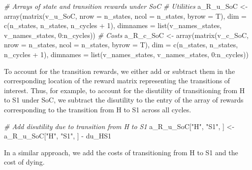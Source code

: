 \documentclass[
]{article}
\newenvironment{Shaded}{\begin{snugshade}}{\end{snugshade}}
\newcommand{\AttributeTok}[1]{\textcolor[rgb]{0.77,0.63,0.00}{#1}}
\newcommand{\CommentTok}[1]{\textcolor[rgb]{0.56,0.35,0.01}{\textit{#1}}}
\newcommand{\DecValTok}[1]{\textcolor[rgb]{0.00,0.00,0.81}{#1}}
\newcommand{\FunctionTok}[1]{\textcolor[rgb]{0.00,0.00,0.00}{#1}}
\newcommand{\NormalTok}[1]{#1}
\newcommand{\OtherTok}[1]{\textcolor[rgb]{0.56,0.35,0.01}{#1}}
\newcommand{\SpecialCharTok}[1]{\textcolor[rgb]{0.00,0.00,0.00}{#1}}
\newcommand{\StringTok}[1]{\textcolor[rgb]{0.31,0.60,0.02}{#1}}
\begin{document}
\begin{Shaded}
\begin{Highlighting}[]
\CommentTok{\# Arrays of state and transition rewards under SoC}
\CommentTok{\# Utilities}
\NormalTok{a\_R\_u\_SoC }\OtherTok{\textless{}{-}} \FunctionTok{array}\NormalTok{(}\FunctionTok{matrix}\NormalTok{(v\_u\_SoC, }\AttributeTok{nrow =}\NormalTok{ n\_states, }\AttributeTok{ncol =}\NormalTok{ n\_states, }\AttributeTok{byrow =}\NormalTok{ T), }
                  \AttributeTok{dim =} \FunctionTok{c}\NormalTok{(n\_states, n\_states, n\_cycles }\SpecialCharTok{+} \DecValTok{1}\NormalTok{),}
                  \AttributeTok{dimnames =} \FunctionTok{list}\NormalTok{(v\_names\_states, v\_names\_states, }\DecValTok{0}\SpecialCharTok{:}\NormalTok{n\_cycles))}
\CommentTok{\# Costs}
\NormalTok{a\_R\_c\_SoC }\OtherTok{\textless{}{-}} \FunctionTok{array}\NormalTok{(}\FunctionTok{matrix}\NormalTok{(v\_c\_SoC, }\AttributeTok{nrow =}\NormalTok{ n\_states, }\AttributeTok{ncol =}\NormalTok{ n\_states, }\AttributeTok{byrow =}\NormalTok{ T), }
                  \AttributeTok{dim =} \FunctionTok{c}\NormalTok{(n\_states, n\_states, n\_cycles }\SpecialCharTok{+} \DecValTok{1}\NormalTok{),}
                  \AttributeTok{dimnames =} \FunctionTok{list}\NormalTok{(v\_names\_states, v\_names\_states, }\DecValTok{0}\SpecialCharTok{:}\NormalTok{n\_cycles))}
\end{Highlighting}
\end{Shaded}

To account for the transition rewards, we either add or subtract them in the corresponding location of the reward matrix representing the transitions of interest. Thus, for example, to account for the disutility of transitioning from H to S1 under SoC, we subtract the disutility to the entry of the array of rewards corresponding to the transition from H to S1 across all cycles.

\begin{Shaded}
\begin{Highlighting}[]
\CommentTok{\# Add disutility due to transition from H to S1}
\NormalTok{a\_R\_u\_SoC[}\StringTok{"H"}\NormalTok{, }\StringTok{"S1"}\NormalTok{, ] }\OtherTok{\textless{}{-}}\NormalTok{ a\_R\_u\_SoC[}\StringTok{"H"}\NormalTok{, }\StringTok{"S1"}\NormalTok{, ] }\SpecialCharTok{{-}}\NormalTok{ du\_HS1}
\end{Highlighting}
\end{Shaded}

In a similar approach, we add the costs of transitioning from H to S1 and the cost of dying.
\end{document}
